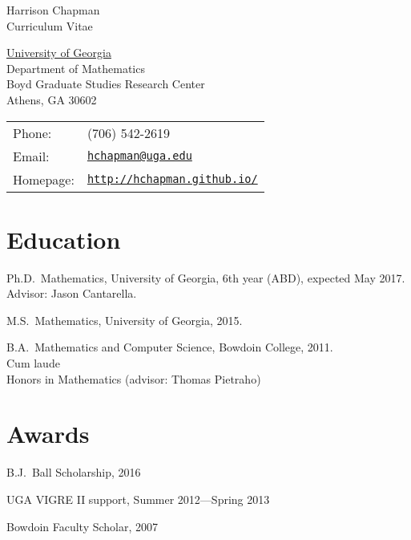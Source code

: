 \documentclass[letterpaper]{article}
\def\name{Harrison Chapman}
\renewenvironment{itemize}{
  \begin{list}{}{
    \setlength{\leftmargin}{1.5em}
  }
}{
  \end{list}
}
\begin{document}
{\huge \name}\\
{\large\sc Curriculum Vitae}


\vspace{0.25in}

\begin{minipage}{0.45\linewidth}
  \href{http://www.uga.edu/}{University of Georgia} \\
  Department of Mathematics \\
  Boyd Graduate Studies Research Center \\
  Athens, GA 30602
\end{minipage}
\begin{minipage}{0.45\linewidth}
  \begin{tabular}{ll}
    Phone: & (706) 542-2619 \\
    Email: & \href{mailto:hchapman@uga.edu}{\tt hchapman@uga.edu} \\
    Homepage: & \href{http://hchapman.github.io/}{\tt http://hchapman.github.io/} \\
  \end{tabular}
\end{minipage}

\section*{Education}

\begin{itemize}
\item Ph.D.\ Mathematics, University of Georgia, 6th year (ABD), expected May
  2017.\\
  \textbullet \quad Advisor: Jason Cantarella.
\item M.S.\ Mathematics, University of Georgia, 2015.
\item B.A.\ Mathematics and Computer Science, Bowdoin College,
  2011.\\
  \textbullet \quad Cum laude \\
  \textbullet \quad Honors in Mathematics (advisor: Thomas Pietraho)
\end{itemize}

 \section*{Awards}

 \begin{itemize}
 \item B.J.\ Ball Scholarship, 2016
 \item UGA VIGRE II support, Summer 2012---Spring 2013
 \item Bowdoin Faculty Scholar, 2007
 \end{itemize}
\end{document}
